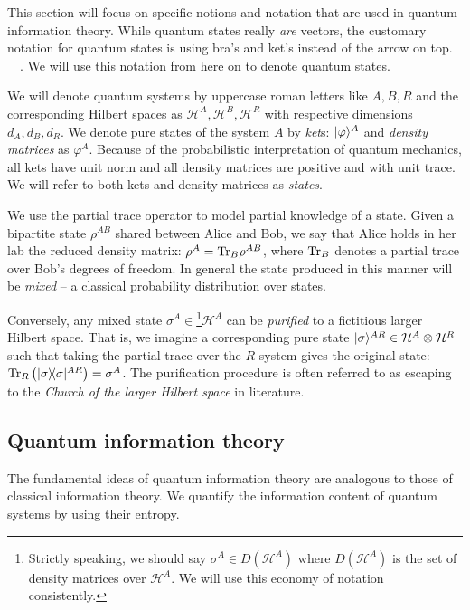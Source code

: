 \documentclass[aps,11pt,twoside,letterpaper]{article}
\def\Tr{\textup{Tr}}
\def\ph{\varphi}
\def\cH{\mathcal{H}}
\begin{document}
		
		This section will focus on specific notions and notation that are used in quantum information theory.
		While quantum states really \emph{are} vectors, the customary notation for quantum states 
		is using bra's and ket's instead of the arrow on top.
		\be
				\ket{\psi} \ 	\triangleq \ \vec{\psi}.
		\ee
		We will use this notation from here on to denote quantum states.
		
		
		We will denote quantum systems by uppercase roman letters like $A,B,R$ and the corresponding 
		Hilbert spaces as $\cH^A, \cH^B, \cH^R$ with respective dimensions $d_A,d_B,d_R$.
	    We denote pure states of the system $A$ by \emph{ket}s: $\ket{\ph}^A$
	    and \emph{density matrices} as $\ph^A$.		%
		Because of the probabilistic interpretation of quantum mechanics, all kets have unit norm and all
		density matrices are positive and with unit trace.
	    We will refer to both kets and density matrices as \emph{states}.
	    
		We use the partial trace operator to model partial knowledge of a state.
		Given a bipartite state $\rho^{AB}$ shared between Alice and Bob, we say that Alice holds in her lab
		the reduced density matrix: $\rho^A = \Tr_B\rho^{AB}$, where $\Tr_B$ denotes a partial trace over 
		Bob's degrees of freedom.
		In general the state produced in this manner will be \emph{mixed} -- a classical probability distribution
		over states.
		
		Conversely, any mixed state $\sigma^A \in$\footnote{Strictly speaking, we should say 
		$\sigma^A \in D(\cH^A)$ where $D(\cH^A)$ is the set of density matrices over $\cH^A$. 
		We will use this economy of notation consistently.}$\cH^A$
		 can be \emph{purified} to a fictitious 
		larger Hilbert space. 
		That is, we imagine a corresponding pure state $\ket{\sigma}^{AR} \in \cH^A \otimes \cH^R$
		such that taking the partial trace over the $R$ system gives the original state: 
		$\Tr_R\left(\proj{\sigma}^{AR}\right)=\sigma^A$. 
		The purification procedure is often referred to as escaping to the \emph{Church of the larger
		Hilbert space} in literature.

		
	\subsection{Quantum information theory}
	
		The fundamental ideas of quantum information theory are analogous to those of classical information theory. 
		We quantify the information content of quantum systems 
		by using their entropy.
		
\end{document}
